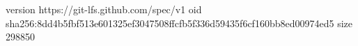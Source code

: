 version https://git-lfs.github.com/spec/v1
oid sha256:8dd4b5fbf513e601325ef3047508ffcfb5f336d59435f6cf160bb8ed00974ed5
size 298850

